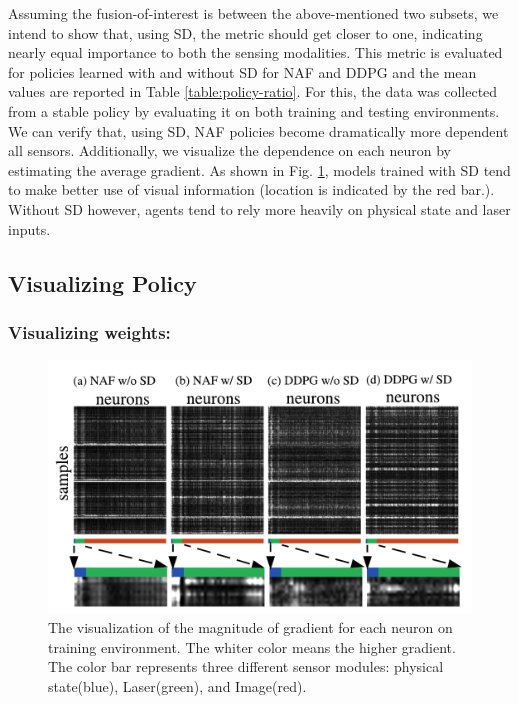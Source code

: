 \documentclass[../thesis.tex]{subfiles}
\begin{document}
 Assuming the fusion-of-interest is between the above-mentioned two subsets, we intend to show that, using SD, the metric should get closer to one, indicating nearly equal importance to both the sensing modalities. This metric is evaluated for policies learned with and without SD for NAF and DDPG and the mean values are reported in Table \ref{table:policy-ratio}. For this, the data was collected from a stable policy by evaluating it on both training and testing environments. We can verify that, using SD, NAF policies become dramatically more dependent all sensors. Additionally, we visualize the dependence on each neuron by estimating the average gradient. As shown in Fig. \ref{fig:grad_exp}, models trained with SD tend to make better use of visual information (location is indicated by the red bar.). Without SD however, agents tend to rely more heavily on physical state and laser inputs. 


\subsection{Visualizing Policy}

\subsubsection{Visualizing weights:}

\begin{figure}[t]
	\begin{center}
		\centerline{\includegraphics[width=0.8\columnwidth]{./MultimodalDRL/fig/grad2.png}}
		\caption{The visualization of the magnitude of gradient for each neuron on training environment. The whiter color means the higher gradient. The color bar represents three different sensor modules: physical state(blue), Laser(green), and Image(red).}
		\label{fig:grad_exp}
	\end{center}
\end{figure} 
\end{document}
